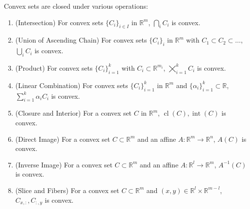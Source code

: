 \begin{prop}\label{prop:011-conv-yoga}
	Convex sets are closed under various operations:
	\begin{enumerate}[label=(\alph*)]
		\item (Intersection) For convex sets $\{C_i\}_{i\in I}$ in $\mathbb{R}^m$, $\bigcap_iC_i$ is convex.
		\item (Union of Ascending Chain) For convex sets $\{C_i\}_{i}$ in $\mathbb{R}^m$ with $C_1\subset C_2\subset\dotsc$, $\bigcup_iC_i$ is convex.
		\item (Product) For convex sets $\{C_i\}_{i=1}^k$ with $C_i\subset \mathbb{R}^{m_i}$, $\bigtimes_{i=1}^kC_i$ is convex.
		\item (Linear Combination) For convex sets $\{C_i\}_{i=1}^k$ in $\mathbb{R}^m$ and $\{\alpha_i\}_{i=1}^k\subset \mathbb{R}$, $\sum_{i=1}^k\alpha_iC_i$ is convex.
		\item (Closure and Interior) For a convex set $C$ in $\mathbb{R}^m$, $\operatorname{cl}(C),\operatorname{int}(C)$ is convex.
		\item (Direct Image) For a convex set $C\subset \mathbb{R}^m$ and an affine $A:\mathbb{R}^m\to \mathbb{R}^n$, $A(C)$ is convex.
		\item (Inverse Image) For a convex set $C\subset \mathbb{R}^m$ and an affine $A:\mathbb{R}^l\to \mathbb{R}^m$, $A^{-1}(C)$ is convex.
		\item (Slice and Fibers) For a convex set $C\subset \mathbb{R}^m$ and $(x,y)\in \mathbb{R}^l\times \mathbb{R}^{m-l}$, $C_{x,:},C_{:,y}$ is convex.
	\end{enumerate}
\end{prop}
